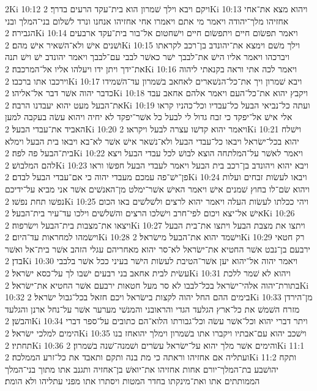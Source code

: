 2Ki 10:12  ויקם ויבא וילך שׁמרון הוא בית־עקד הרעים בדרך׃
2Ki 10:13  ויהוא מצא את־אחי אחזיהו מלך־יהודה ויאמר מי אתם ויאמרו אחי אחזיהו אנחנו ונרד לשׁלום בני־המלך ובני הגבירה׃
2Ki 10:14  ויאמר תפשׂום חיים ויתפשׂום חיים וישׁחטום אל־בור בית־עקד ארבעים ושׁנים אישׁ ולא־השׁאיר אישׁ מהם׃
2Ki 10:15  וילך משׁם וימצא את־יהונדב בן־רכב לקראתו ויברכהו ויאמר אליו הישׁ את־לבבך ישׁר כאשׁר לבבי עם־לבבך ויאמר יהונדב ישׁ וישׁ תנה את־ידך ויתן ידו ויעלהו אליו אל־המרכבה׃
2Ki 10:16  ויאמר לכה אתי וראה בקנאתי ליהוה וירכבו אתו ברכבו׃
2Ki 10:17  ויבא שׁמרון ויך את־כל־הנשׁארים לאחאב בשׁמרון עד־השׁמידו כדבר יהוה אשׁר דבר אל־אליהו׃
2Ki 10:18  ויקבץ יהוא את־כל־העם ויאמר אלהם אחאב עבד את־הבעל מעט יהוא יעבדנו הרבה׃
2Ki 10:19  ועתה כל־נביאי הבעל כל־עבדיו וכל־כהניו קראו אלי אישׁ אל־יפקד כי זבח גדול לי לבעל כל אשׁר־יפקד לא יחיה ויהוא עשׂה בעקבה למען האביד את־עבדי הבעל׃
2Ki 10:20  ויאמר יהוא קדשׁו עצרה לבעל ויקראו׃
2Ki 10:21  וישׁלח יהוא בכל־ישׂראל ויבאו כל־עבדי הבעל ולא־נשׁאר אישׁ אשׁר לא־בא ויבאו בית הבעל וימלא בית־הבעל פה לפה׃
2Ki 10:22  ויאמר לאשׁר על־המלתחה הוצא לבושׁ לכל עבדי הבעל ויצא להם המלבושׁ׃
2Ki 10:23  ויבא יהוא ויהונדב בן־רכב בית הבעל ויאמר לעבדי הבעל חפשׂו וראו פן־ישׁ־פה עמכם מעבדי יהוה כי אם־עבדי הבעל לבדם׃
2Ki 10:24  ויבאו לעשׂות זבחים ועלות ויהוא שׂם־לו בחוץ שׁמנים אישׁ ויאמר האישׁ אשׁר־ימלט מן־האנשׁים אשׁר אני מביא על־ידיכם נפשׁו תחת נפשׁו׃
2Ki 10:25  ויהי ככלתו לעשׂות העלה ויאמר יהוא לרצים ולשׁלשׁים באו הכום אישׁ אל־יצא ויכום לפי־חרב וישׁלכו הרצים והשׁלשׁים וילכו עד־עיר בית־הבעל׃
2Ki 10:26  ויצאו את־מצבות בית־הבעל וישׂרפוה׃
2Ki 10:27  ויתצו את מצבת הבעל ויתצו את־בית הבעל וישׂמהו למחראות עד־היום׃
2Ki 10:28  וישׁמד יהוא את־הבעל מישׂראל׃
2Ki 10:29  רק חטאי ירבעם בן־נבט אשׁר החטיא את־ישׂראל לא־סר יהוא מאחריהם עגלי הזהב אשׁר בית־אל ואשׁר בדן׃
2Ki 10:30  ויאמר יהוה אל־יהוא יען אשׁר־הטיבת לעשׂות הישׁר בעיני ככל אשׁר בלבבי עשׂית לבית אחאב בני רבעים ישׁבו לך על־כסא ישׂראל׃
2Ki 10:31  ויהוא לא שׁמר ללכת בתורת־יהוה אלהי־ישׂראל בכל־לבבו לא סר מעל חטאות ירבעם אשׁר החטיא את־ישׂראל׃
2Ki 10:32  בימים ההם החל יהוה לקצות בישׂראל ויכם חזאל בכל־גבול ישׂראל׃
2Ki 10:33  מן־הירדן מזרח השׁמשׁ את כל־ארץ הגלעד הגדי והראובני והמנשׁי מערער אשׁר על־נחל ארנן והגלעד והבשׁן׃
2Ki 10:34  ויתר דברי יהוא וכל־אשׁר עשׂה וכל־גבורתו הלוא־הם כתובים על־ספר דברי הימים למלכי ישׂראל׃
2Ki 10:35  וישׁכב יהוא עם־אבתיו ויקברו אתו בשׁמרון וימלך יהואחז בנו תחתיו׃
2Ki 10:36  והימים אשׁר מלך יהוא על־ישׂראל עשׂרים ושׁמנה־שׁנה בשׁמרון׃
2Ki 11:1  ועתליה אם אחזיהו וראתה כי מת בנה ותקם ותאבד את כל־זרע הממלכה׃
2Ki 11:2  ותקח יהושׁבע בת־המלך־יורם אחות אחזיהו את־יואשׁ בן־אחזיה ותגנב אתו מתוך בני־המלך הממותתים אתו ואת־מינקתו בחדר המטות ויסתרו אתו מפני עתליהו ולא הומת׃
